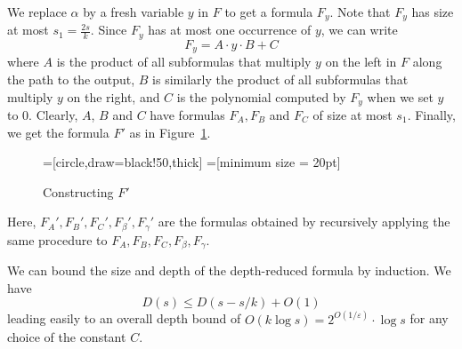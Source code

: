 \documentclass[10pt,a4paper]{article}
\begin{document}
We replace $\alpha$ by a fresh variable $y$ in $F$ to get a formula $F_y$. Note that $F_y$ has size at most $s_1 =  \frac{2s}{k}.$ Since $F_y$ has at most one occurrence of $y$, we can write
\[
F_y = A \cdot y \cdot B + C 
\]
where $A$ is the product of all subformulas that multiply $y$ on the left in $F$ along the path to the output, $B$ is similarly the product of all subformulas that multiply $y$ on the right, and $C$ is the polynomial computed by $F_y$ when we set $y$ to $0$. Clearly, $A$, $B$ and $C$ have formulas $F_A, F_B$ and $F_C$ of size at most $s_1$. Finally, we get the formula $F'$ as in Figure~\ref{fig}.
\begin{figure}[h]
	\centering
	=[circle,draw=black!50,thick]
	=[minimum size = 20pt]
	\caption{Constructing $F'$}
	\label{fig}
\end{figure}

Here, $F_A', F_B', F_C', F_\beta', F_\gamma'$ are the formulas obtained by recursively applying the same procedure to $F_A, F_B, F_C, F_\beta, F_\gamma$.

We can bound the size and depth of the depth-reduced formula by induction. We have
\[
D(s) \leq D(s-s/k) + O(1)
\]
leading easily to an overall depth bound of $O(k\log s)  = 2^{O(1/\varepsilon)}\cdot \log s$ for any choice of the constant $C$. 
\end{document}
